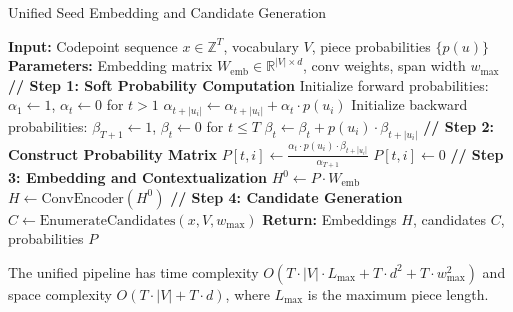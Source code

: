 \begin{algorithm}[H]
	\caption{Unified Seed Embedding and Candidate Generation}
	\label{alg:seed-embedding-pipeline}
	\begin{algorithmic}[1]
		\STATE \textbf{Input:} Codepoint sequence \(x \in \mathbb{Z}^T\), vocabulary \(V\), 
		\STATE \qquad piece probabilities \(\{p(u)\}\)
		\STATE \textbf{Parameters:} Embedding matrix \(W_{\mathrm{emb}} \in \mathbb{R}^{|V| \times d}\), 
		\STATE \qquad conv weights, span width \(w_{\max}\)
		\STATE
		\STATE \textbf{// Step 1: Soft Probability Computation}
		\STATE Initialize forward probabilities: \(\alpha_1 \leftarrow 1\), 
		\STATE \qquad \(\alpha_t \leftarrow 0\) for \(t > 1\)
		\STATE \(\alpha_{t + |u_i|} \leftarrow \alpha_{t + |u_i|} + \alpha_t \cdot p(u_i)\)
		\ENDFOR
		\ENDFOR
		\STATE
		\STATE Initialize backward probabilities: \(\beta_{T+1} \leftarrow 1\), 
		\STATE \qquad \(\beta_t \leftarrow 0\) for \(t \leq T\)
		\STATE \(\beta_t \leftarrow \beta_t + p(u_i) \cdot \beta_{t + |u_i|}\)
		\ENDFOR
		\ENDFOR
		\STATE
		\STATE \textbf{// Step 2: Construct Probability Matrix}
		\STATE \(P[t, i] \leftarrow \frac{\alpha_t \cdot p(u_i) \cdot \beta_{t + |u_i|}}{\alpha_{T+1}}\)
		\ELSE
		\STATE \(P[t, i] \leftarrow 0\)
		\ENDIF
		\ENDFOR
		\ENDFOR
		\STATE
		\STATE \textbf{// Step 3: Embedding and Contextualization}
		\STATE \(H^0 \leftarrow P \cdot W_{\mathrm{emb}}\) 
		\STATE \(H \leftarrow \text{ConvEncoder}(H^0)\) 
		\STATE
		\STATE \textbf{// Step 4: Candidate Generation}
		\STATE \(C \leftarrow \text{EnumerateCandidates}(x, V, w_{\max})\) 
		\STATE \qquad {}
		\STATE
		\STATE \textbf{Return:} Embeddings \(H\), candidates \(C\), probabilities \(P\)
	\end{algorithmic}
\end{algorithm}

\begin{proposition}
	The unified pipeline has time complexity \(O(T \cdot |V| \cdot L_{\max} + T \cdot d^2 + T \cdot w_{\max}^2)\) and space complexity \(O(T \cdot |V| + T \cdot d)\), where \(L_{\max}\) is the maximum piece length.
\end{proposition}

